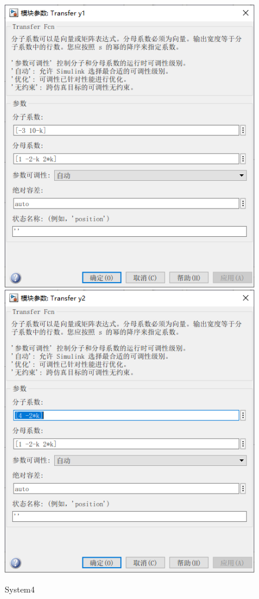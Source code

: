 \documentclass[12pt,a4paper,oneside]{ctexart}
\begin{document}
    \begin{figure}[H]
        \includegraphics[height = 0.35\textheight]{../screenshots/MT1S4Tran1.PNG}
        \includegraphics[height = 0.35\textheight]{../screenshots/MT1S4Tran2.PNG}
        \caption{System4}
    \end{figure}
\end{document}
